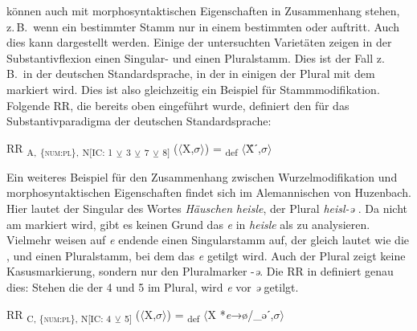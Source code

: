 \begin{exe}
\begin{exe}
 können auch mit morphosyntaktischen Eigenschaften in Zusammenhang stehen, z.\,B.\ wenn ein bestimmter Stamm nur in einem bestimmten  oder  auftritt. Auch dies kann dargestellt werden. Einige der untersuchten Varietäten zeigen in der Substantivflexion einen Singular- und einen Pluralstamm. Dies ist der Fall z.\,B.\ in der deutschen Standardsprache, in der in einigen  der Plural mit dem  markiert wird. Dies ist also gleichzeitig ein Beispiel für Stammmodifikation. Folgende RR, die bereits oben eingeführt wurde, definiert den  für das Substantivparadigma der deutschen Standardsprache:

\begin{exe}%
RR \textsubscript{A,} \textsubscript{\{\textsc{num:pl}\},} \textsubscript{N[IC: 1} \textsubscript{${\veebar}$}\textsubscript{ 3} \textsubscript{${\veebar}$}\textsubscript{ 7} \textsubscript{${\veebar}$}\textsubscript{ 8]} ($\langle$X,$\sigma$$\rangle$) = \textsubscript{def} $\langle$Ẍˊ,$\sigma$$\rangle$
\end{exe}

Ein weiteres Beispiel für den Zusammenhang zwischen Wurzelmodifikation und morphosyntaktischen Eigenschaften findet sich im Alemannischen von Huzenbach. Hier lautet der Singular des Wortes \textit{Häuschen} \textit{heisle}, der Plural \textit{heisl-ə} \citep[98]{Baur1967}. Da  nicht am  markiert wird, gibt es keinen Grund das \textit{e} in \textit{heisle} als  zu analysieren. Vielmehr weisen auf \textit{e} endende  einen Singularstamm auf, der gleich lautet wie die , und einen Pluralstamm, bei dem das \textit{e} getilgt wird. Auch der Plural zeigt keine Kasusmarkierung, sondern nur den Pluralmarker -\textit{ə}. Die RR in  definiert genau dies: Stehen die  der  4 und 5 im Plural, wird \textit{e} vor \textit{ə} getilgt.\largerpage[2]

\ea%
    \label{ex:key:44}
 RR \textsubscript{C, \{\textsc{num:pl}\}, N[IC: 4} \textsubscript{${\veebar}$} \textsubscript{5]} ($\langle$X,$\sigma$$\rangle$) = \textsubscript{def} $\langle$X *\textit{e}→ø/\_əˊ,$\sigma$$\rangle$
\z


\end{exe}
\end{exe}
